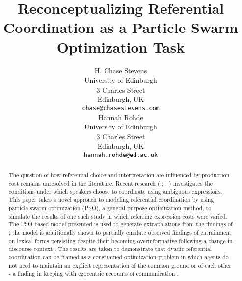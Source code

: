 \documentclass[11pt]{article}
\title{Reconceptualizing Referential Coordination as a Particle Swarm Optimization Task}
\author{H. Chase Stevens \\
  University of Edinburgh \\
  3 Charles Street \\
  Edinburgh, UK \\
  {\tt chase@chasestevens.com} \\\And
  Hannah Rohde \\
  University of Edinburgh \\
  3 Charles Street \\
  Edinburgh, UK \\
  {\tt hannah.rohde@ed.ac.uk} \\}
\date{}
\begin{document}
\maketitle
\begin{abstract}
The question of how referential choice and interpretation are influenced by production cost remains unresolved in the literature. Recent research (\citeauthor{rohde2012} \citeyear{rodhe2012}; \citeauthor{degen2012} \citeyear{degen2012}; \citeauthor{frank2012} \citeyear{frank2012}) investigates the conditions under which speakers choose to coordinate using ambiguous expressions. This paper takes a novel approach to modeling referential coordination by using particle swarm optimization (PSO), a general-purpose optimization method, to simulate the results of one such study \citep{rohde2012} in which referring expression costs were varied. The PSO-based model presented is used to generate extrapolations from the findings of \cite{rohde2012}; the model is additionally shown to partially emulate observed findings of entrainment on lexical forms persisting despite their becoming overinformative following a change in discourse context \citep{brennan1996}. The results are taken to demonstrate that dyadic referential coordination can be framed as a constrained optimization problem in which agents do not need to maintain an explicit representation of the common ground or of each other - a finding in keeping with egocentric accounts of communication \citep{horton1996}.
\end{abstract}
\end{document}
